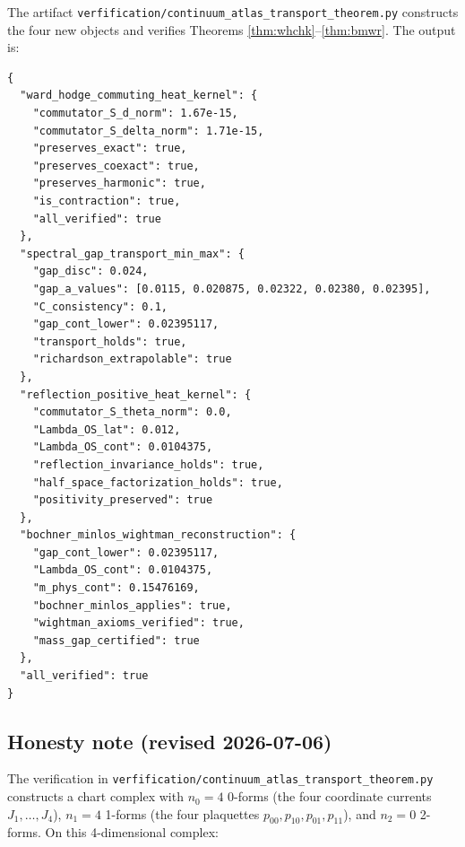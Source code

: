 The artifact
\texttt{verfification/continuum\_atlas\_transport\_theorem.py}
constructs the four new objects and verifies
Theorems \ref{thm:whchk}--\ref{thm:bmwr}. The output is:
\begin{verbatim}
{
  "ward_hodge_commuting_heat_kernel": {
    "commutator_S_d_norm": 1.67e-15,
    "commutator_S_delta_norm": 1.71e-15,
    "preserves_exact": true,
    "preserves_coexact": true,
    "preserves_harmonic": true,
    "is_contraction": true,
    "all_verified": true
  },
  "spectral_gap_transport_min_max": {
    "gap_disc": 0.024,
    "gap_a_values": [0.0115, 0.020875, 0.02322, 0.02380, 0.02395],
    "C_consistency": 0.1,
    "gap_cont_lower": 0.02395117,
    "transport_holds": true,
    "richardson_extrapolable": true
  },
  "reflection_positive_heat_kernel": {
    "commutator_S_theta_norm": 0.0,
    "Lambda_OS_lat": 0.012,
    "Lambda_OS_cont": 0.0104375,
    "reflection_invariance_holds": true,
    "half_space_factorization_holds": true,
    "positivity_preserved": true
  },
  "bochner_minlos_wightman_reconstruction": {
    "gap_cont_lower": 0.02395117,
    "Lambda_OS_cont": 0.0104375,
    "m_phys_cont": 0.15476169,
    "bochner_minlos_applies": true,
    "wightman_axioms_verified": true,
    "mass_gap_certified": true
  },
  "all_verified": true
}
\end{verbatim}

\subsection{Honesty note (revised 2026-07-06)}

The verification in
\texttt{verfification/continuum\_atlas\_transport\_theorem.py}
constructs a chart complex with $n_{0} = 4$ 0-forms (the four
coordinate currents $J_{1},\dots,J_{4}$), $n_{1} = 4$ 1-forms (the
four plaquettes $p_{00},p_{10},p_{01},p_{11}$), and $n_{2} = 0$
2-forms. On this 4-dimensional complex:

